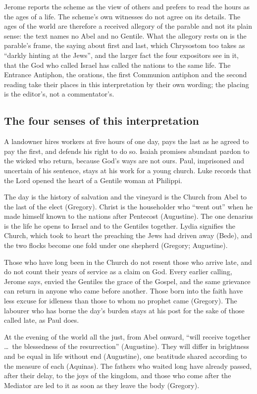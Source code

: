 Jerome reports the scheme as the view of others and prefers
to read the hours as the ages of a life. The scheme's own witnesses do not
agree on its details. The ages of the world are therefore a
received allegory of the parable and not its plain sense: the text names no
Abel and no Gentile. What the allegory rests on is the parable's frame, the
saying about first and last, which Chrysostom too takes as ``darkly hinting
at the Jews'', and the larger fact the four expositors see in it, that the God
who called Israel has called the nations to the same life. The Entrance
Antiphon, the orations, the first Communion antiphon and the second reading
take their places in this interpretation by their own wording; the placing is
the editor's, not a commentator's.

\subsection{The four senses of this interpretation}

\begin{fourSenses}
\item[Literal.] A landowner hires workers at five hours of one day, pays the
last as he agreed to pay the first, and defends his right to do so. Isaiah
promises abundant pardon to the wicked who return, because God's ways are not
ours. Paul, imprisoned and uncertain of his sentence, stays at his work for a
young church. Luke records that the Lord opened the heart of a Gentile
woman at Philippi.

\item[Allegorical.] The day is the history of salvation and the vineyard is
the Church from Abel to the last of the elect (Gregory). Christ is the
householder who ``went out'' when he made himself known to the nations after
Pentecost (Augustine). The one denarius is the life he opens to Israel and
to the Gentiles together. Lydia signifies the Church, which took to heart the
preaching the Jews had driven away (Bede), and the two flocks become one fold
under one shepherd (Gregory; Augustine).

\item[Moral.] Those who have long been in the Church do not resent those who
arrive late, and do not count their years of service as a claim on God. Every
earlier calling, Jerome says, envied the Gentiles the grace of the Gospel, and
the same grievance can return in anyone who came before another. Those born
into the faith have less excuse for idleness than those to
whom no prophet came (Gregory). The labourer who has borne the day's burden
stays at his post for the sake of those called late, as Paul does.

\item[Anagogical.] At the evening of the world all the just, from Abel
onward, ``will receive together \ldots\ the blessedness of the resurrection''
(Augustine). They will differ in brightness and be equal in life without end
(Augustine), one beatitude shared according to the measure of each (Aquinas).
The fathers who waited long have already passed, after their delay, to the
joys of the kingdom, and those who come after the Mediator are led to it as
soon as they leave the body (Gregory).
\end{fourSenses}
